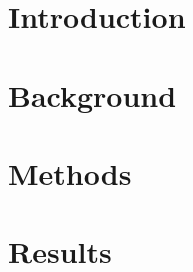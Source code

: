 \documentclass[oneside,12pt]{report}
\begin{document}





% 

\clearpage

% 

\clearpage



\clearpage

\clearpage



\clearpage

\tableofcontents

\clearpage

\listoffigures

\clearpage

\listoftables

\clearpage
\pagestyle{main}

\chapter{Introduction}


% 

\chapter{Background}
\label{chp:background}


\chapter{Methods}
\label{chp:method}


\chapter{Results}
\label{chp:result}

\end{document}

